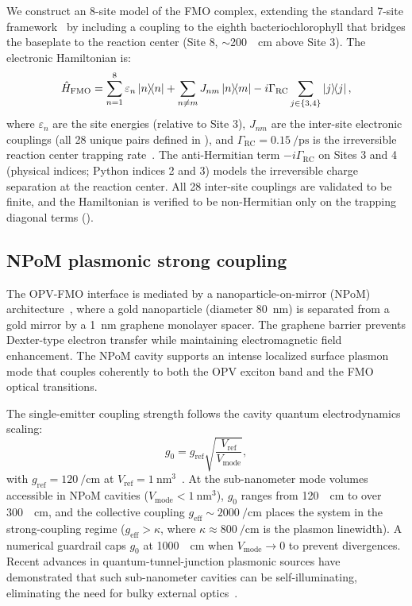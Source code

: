 \documentclass[preprint,12pt]{elsarticle}
\begin{document}
We construct an 8-site model of the FMO complex, extending the standard 7-site framework~\cite{Adolphs2006} by including a coupling to the eighth bacteriochlorophyll that bridges the baseplate to the reaction center (Site 8, $\sim$\qty{200}{\per\cm} above Site 3).
The electronic Hamiltonian is:
\begin{equation}
\hat{H}_{\mathrm{FMO}} = \sum_{n=1}^{8} \varepsilon_n \dyad{n} + \sum_{n \neq m} J_{nm} \dyad{n}{m} - i\Gamma_{\mathrm{RC}} \sum_{j \in \{3,4\}} \dyad{j}{j},
\label{eq:fmo_hamiltonian}
\end{equation}
where $\varepsilon_n$ are the site energies (relative to Site 3), $J_{nm}$ are the inter-site electronic couplings (all 28 unique pairs defined in ), and $\Gamma_{\mathrm{RC}} = \qty{0.15}{\per\ps}$ is the irreversible reaction center trapping rate~\cite{Renger2003}.
The anti-Hermitian term $-i\Gamma_{\mathrm{RC}}$ on Sites 3 and 4 (physical indices; Python indices 2 and 3) models the irreversible charge separation at the reaction center.
All 28 inter-site couplings are validated to be finite, and the Hamiltonian is verified to be non-Hermitian only on the trapping diagonal terms ().

\subsection*{NPoM plasmonic strong coupling}

The OPV-FMO interface is mediated by a nanoparticle-on-mirror (NPoM) architecture~\cite{Chikkaraddy2016}, where a gold nanoparticle (diameter \qty{80}{\nm}) is separated from a gold mirror by a \qty{1}{\nm} graphene monolayer spacer.
The graphene barrier prevents Dexter-type electron transfer while maintaining electromagnetic field enhancement.
The NPoM cavity supports an intense localized surface plasmon mode that couples coherently to both the OPV exciton band and the FMO optical transitions.

The single-emitter coupling strength follows the cavity quantum electrodynamics scaling:
\begin{equation}
g_0 = g_{\mathrm{ref}} \sqrt{\frac{V_{\mathrm{ref}}}{V_{\mathrm{mode}}}},
\label{eq:coupling_scaling}
\end{equation}
with $g_{\mathrm{ref}} = \qty{120}{\per\cm}$ at $V_{\mathrm{ref}} = \qty{1}{\nm\cubed}$~\cite{Chikkaraddy2016}.
At the sub-nanometer mode volumes accessible in NPoM cavities ($V_{\mathrm{mode}} < \qty{1}{\nm\cubed}$), $g_0$ ranges from \qty{120}{\per\cm} to over \qty{300}{\per\cm}, and the collective coupling $g_{\mathrm{eff}} \sim \qty{2000}{\per\cm}$ places the system in the strong-coupling regime ($g_{\mathrm{eff}} > \kappa$, where $\kappa \approx \qty{800}{\per\cm}$ is the plasmon linewidth).
A numerical guardrail caps $g_0$ at \qty{1000}{\per\cm} when $V_{\mathrm{mode}} \to 0$ to prevent divergences.
Recent advances in quantum-tunnel-junction plasmonic sources have demonstrated that such sub-nanometer cavities can be self-illuminating, eliminating the need for bulky external optics~\cite{Lee2025}.
\end{document}
